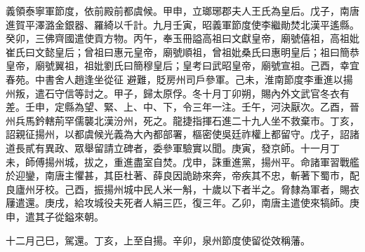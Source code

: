 \begin{pinyinscope}
 義領泰寧軍節度，依前殿前都虞候。甲申，立瑯琊郡夫人王氏為皇后。戊子，南唐進賀平澤潞金銀器、羅綺以千計。九月壬寅，昭義軍節度使李繼勛焚北漢平遙縣。癸卯，三佛齊國遣使貢方物。丙午，奉玉冊謚高祖曰文獻皇帝，廟號僖祖，高祖妣崔氏曰文懿皇后；曾祖曰惠元皇帝，廟號順祖，曾祖妣桑氏曰惠明皇后；祖曰簡恭皇帝，廟號翼祖，祖妣劉氏曰簡穆皇后；皇考曰武昭皇帝，廟號宣祖。己酉，幸宜春苑。中書舍人趙逢坐從征
 避難，貶房州司戶參軍。己未，淮南節度李重進以揚州叛，遣石守信等討之。甲子，歸太原俘。冬十月丁卯朔，賜內外文武官冬衣有差。壬申，定縣為望、緊、上、中、下，令三年一注。壬午，河決厭次。乙酉，晉州兵馬鈐轄荊罕儒襲北漢汾州，死之。龍捷指揮石進二十九人坐不救棄市。丁亥，詔親征揚州，以都虞候光義為大內都部署，樞密使吳廷祚權上都留守。戊子，詔諸道長貳有異政、眾舉留請立碑者，委參軍驗實以聞。庚寅，發京師。十一月丁
 未，師傅揚州城，拔之，重進盡室自焚。戊申，誅重進黨，揚州平。命諸軍習戰艦於迎鑾，南唐主懼甚，其臣杜著、薛良因詭跡來奔，帝疾其不忠，斬著下蜀市，配良廬州牙校。己酉，振揚州城中民人米一斛，十歲以下者半之。脅隸為軍者，賜衣屨遣還。庚戌，給攻城役夫死者人絹三匹，復三年。乙卯，南唐主遣使來犒師。庚申，遣其子從鎰來朝。



 十二月己巳，駕還。丁亥，上至自揚。辛卯，泉州節度使留從效稱藩。




\end{pinyinscope}

